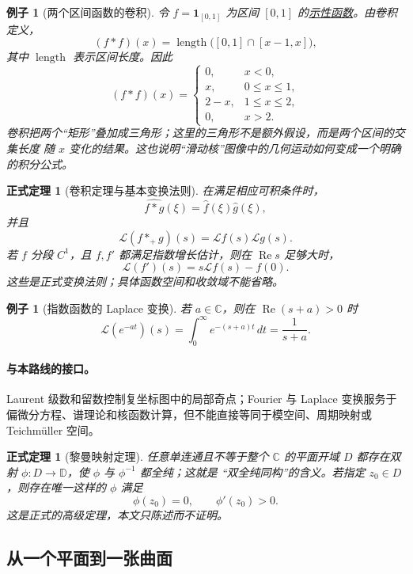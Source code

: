 \documentclass[UTF8,fontset=none,a4paper,11pt]{ctexart}
\theoremstyle{foundation-definition}
\theoremstyle{foundation-theorem}
\newtheorem{theorem}[definition]{正式定理}
\theoremstyle{foundation-proposition}
\theoremstyle{foundation-example}
\newtheorem{example}[definition]{例子}
\theoremstyle{foundation-remark}
\theoremstyle{foundation-theorem}
\newcommand{\C}{\mathbb C}
\newcommand{\term}[2]{\hyperref[#1]{#2}}
\begin{document}
\begin{example}[两个区间函数的卷积]
令 \(f=\mathbf 1_{[0,1]}\) 为区间 \([0,1]\) 的\term{def:indicator-function}{示性函数}。由卷积定义，
\[
(f*f)(x)=\operatorname{length}\bigl([0,1]\cap[x-1,x]\bigr),
\]
其中 \(\term{def:interval-length}{\operatorname{length}}\) 表示区间长度。因此
\[
(f*f)(x)=
\begin{cases}
0,&x<0,\\
x,&0\leq x\leq1,\\
2-x,&1\leq x\leq2,\\
0,&x>2.
\end{cases}
\]
卷积把两个“矩形”叠加成三角形；这里的三角形不是额外假设，而是两个区间的交集长度
随 \(x\) 变化的结果。这也说明“滑动核”图像中的几何运动如何变成一个明确的积分公式。
\end{example}

\begin{theorem}[卷积定理与基本变换法则]
在满足相应可积条件时，
\[
\widehat{f*g}(\xi)=\widehat f(\xi)\widehat g(\xi),
\]
并且
\[
\mathcal L(f*_{+}g)(s)=\mathcal Lf(s)\mathcal Lg(s).
\]
若 \(f\) 分段 \(C^1\)，且 \(f,f'\) 都满足指数增长估计，则在
\(\operatorname{Re}s\) 足够大时，
\[
\mathcal L(f')(s)=s\mathcal Lf(s)-f(0).
\]
这些是正式变换法则；具体函数空间和收敛域不能省略。
\end{theorem}

\begin{example}[指数函数的 Laplace 变换]
若 \(a\in\mathbb C\)，则在 \(\operatorname{Re}(s+a)>0\) 时
\[
\mathcal L(e^{-at})(s)=\int_0^\infty e^{-(s+a)t}\,dt
=\frac{1}{s+a}.
\]
\end{example}

\paragraph{与本路线的接口。}
Laurent 级数和留数控制复坐标图中的局部奇点；Fourier 与 Laplace 变换服务于偏微分方程、谱理论和核函数计算，但不能直接等同于模空间、周期映射或 Teichmüller 空间。

\begin{theorem}[黎曼映射定理]
任意单连通且不等于整个 \(\C\) 的平面开域 \(D\) 都存在双射
\(\phi:D\to\mathbb D\)，使 \(\phi\) 与 \(\phi^{-1}\) 都全纯；这就是
“双全纯同构”的含义。若指定 \(z_0\in D\)，则存在唯一这样的 \(\phi\) 满足
\[
\phi(z_0)=0,\qquad \phi'(z_0)>0.
\]
这是正式的高级定理，本文只陈述而不证明。
\end{theorem}

\thispagestyle{fancy}
\subsection{从一个平面到一张曲面}
\end{document}

